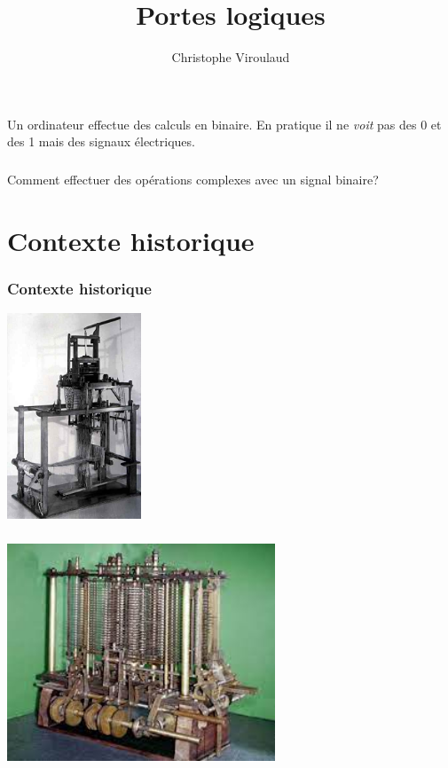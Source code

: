 \documentclass[svgnames,11pt]{beamer}
\author[]{Christophe Viroulaud}
\title{Portes logiques}
\date{\framebox{\textbf{ArchMat 05}}}
\institute{Première - NSI}
\begin{document}
\begin{frame}
    \titlepage
\end{frame}
\begin{frame}
    \frametitle{}

    Un ordinateur effectue des calculs en binaire. En pratique il ne \emph{voit} pas des 0 et des 1 mais des signaux électriques.

\end{frame}
\begin{frame}
    \frametitle{}

    \begin{framed}
        \centering Comment effectuer des opérations complexes avec un signal binaire?
    \end{framed}

\end{frame}
\section{Contexte historique}
\begin{frame}
    \frametitle{Contexte historique}
    \begin{center}
        \centering
        \includegraphics[width=4cm]{ressources/Metier_jacquard.jpg}
        \label{IMG}
    \end{center}


\end{frame}
\begin{frame}
    \frametitle{}

    \begin{center}
        \centering
        \includegraphics[width=8cm]{ressources/babbage.jpeg}
        \label{IMG}
    \end{center}
\end{frame}
\end{document}
